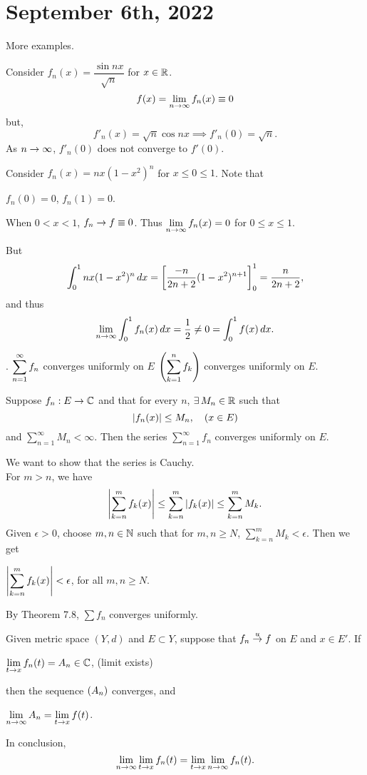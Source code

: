 \section*{September 6th, 2022}

More examples.

 Consider \(f_n(x) = \dfrac{\sin nx}{\sqrt{n}}\) for \(x \in \mathbb{R}\).
\[
    f(x) = \lim_{n\rightarrow\infty} f_n(x) \equiv 0
\]
but,
\[
    f'_n(x) = \sqrt{n}\cos nx \implies f'_n(0) = \sqrt{n}.
\]
As \(n \rightarrow \infty\), \(f'_n(0)\) does not converge to \(f'(0)\).

 Consider \(f_n(x) = nx(1-x^2)^n\) for \(x \leq 0 \leq 1\). Note that
\begin{center}
    \(f_n(0) = 0\), \(f_n(1) = 0\).
\end{center}
When \(0 < x < 1\), \(f_n \rightarrow f \equiv 0\).  Thus \(\displaystyle \lim_{n\rightarrow \infty} f_n(x) = 0\) for \(0 \leq x \leq 1\).

But
\[
    \int_0^1 nx(1-x^2)^n \,d{x} = \left[\frac{-n}{2n+2} (1-x^2)^{n+1}\right]_0^1 = \frac{n}{2n+2},
\]
and thus
\[
    \lim_{n\rightarrow \infty} \int_0^1 f_n(x) \,d{x} = \frac{1}{2} \neq 0 = \int_0^1 f(x)\,d{x}.
\]

. \(\displaystyle \sum_{n=1}^\infty f_n\) converges uniformly on \(E\) \miff \(\displaystyle \left( \sum_{k=1}^n f_k \right)\) converges uniformly on \(E\).

  Suppose \(f_n: E \rightarrow \mathbb{C}\) and that for every \(n\), \(\exists M_n \in \R\) such that
\[
    \left| f_n(x) \right| \leq M_n, \quad (x \in E)
\]
and \(\sum_{n=1}^\infty M_n < \infty\). Then the series \(\sum_{n=1}^\infty f_n\) converges uniformly on \(E\).

\pf We want to show that the series is Cauchy.\\
For \(m > n\), we have
\[
    \left| \sum_{k=n}^m f_k(x) \right| \leq \sum_{k=n}^m \left| f_k(x) \right| \leq \sum_{k=n}^m M_k.
\]
Given \(\epsilon > 0\), choose \(m, n \in \mathbb{N}\) such that for \(m, n \geq N\), \(\sum_{k = n}^m M_k < \epsilon\). Then we get
\begin{center}
    \(\displaystyle \left| \sum_{k=n}^m f_k(x) \right| < \epsilon\), for all \(m, n\geq N\).
\end{center}
By Theorem 7.8, \(\sum f_n\) converges uniformly.

 Given metric space \((Y, d)\) and \(E \subset Y\), suppose that \(f_n \overset{u}{\rightarrow} f\) on \(E\) and \(x \in E'\). If
\begin{center}
    \(\displaystyle \lim_{t \rightarrow x} f_n(t) = A_n \in \mathbb{C}\), \quad (limit exists)
\end{center}
then the sequence \(\left( A_n \right)\) converges, and
\begin{center}
    \(\displaystyle \lim_{n \rightarrow \infty} A_n = \lim_{t \rightarrow x} f(t)\).
\end{center}
In conclusion,
\[
    \lim_{n\rightarrow \infty} \lim_{t \rightarrow x} f_n(t) = \lim_{t\rightarrow x}\lim_{n\rightarrow\infty} f_n(t).
\]

